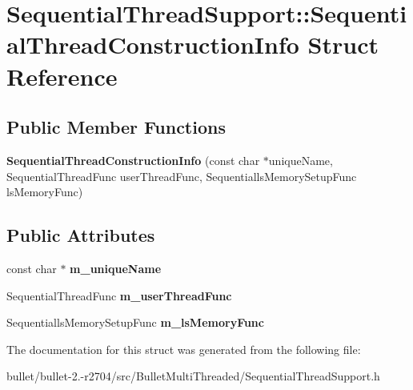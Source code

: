 \hypertarget{struct_sequential_thread_support_1_1_sequential_thread_construction_info}{\section{Sequential\+Thread\+Support\+:\+:Sequential\+Thread\+Construction\+Info Struct Reference}
\label{struct_sequential_thread_support_1_1_sequential_thread_construction_info}
}
\subsection*{Public Member Functions}
\begin{DoxyCompactItemize}
\item 
\hypertarget{struct_sequential_thread_support_1_1_sequential_thread_construction_info_a72715bc63af605f9b87b16559262d3fc}{{\bfseries Sequential\+Thread\+Construction\+Info} (const char $\ast$unique\+Name, Sequential\+Thread\+Func user\+Thread\+Func, Sequentialls\+Memory\+Setup\+Func ls\+Memory\+Func)}\label{struct_sequential_thread_support_1_1_sequential_thread_construction_info_a72715bc63af605f9b87b16559262d3fc}

\end{DoxyCompactItemize}
\subsection*{Public Attributes}
\begin{DoxyCompactItemize}
\item 
\hypertarget{struct_sequential_thread_support_1_1_sequential_thread_construction_info_a852632b3f6de1d08f380e9e4feb25492}{const char $\ast$ {\bfseries m\+\_\+unique\+Name}}\label{struct_sequential_thread_support_1_1_sequential_thread_construction_info_a852632b3f6de1d08f380e9e4feb25492}

\item 
\hypertarget{struct_sequential_thread_support_1_1_sequential_thread_construction_info_a11137c6bbe94036ed8711277092fcb18}{Sequential\+Thread\+Func {\bfseries m\+\_\+user\+Thread\+Func}}\label{struct_sequential_thread_support_1_1_sequential_thread_construction_info_a11137c6bbe94036ed8711277092fcb18}

\item 
\hypertarget{struct_sequential_thread_support_1_1_sequential_thread_construction_info_aa6f4b48dfebf248c31fb0fb14873c0d6}{Sequentialls\+Memory\+Setup\+Func {\bfseries m\+\_\+ls\+Memory\+Func}}\label{struct_sequential_thread_support_1_1_sequential_thread_construction_info_aa6f4b48dfebf248c31fb0fb14873c0d6}

\end{DoxyCompactItemize}


The documentation for this struct was generated from the following file\+:\begin{DoxyCompactItemize}
\item 
bullet/bullet-\/2.-\/r2704/src/\+Bullet\+Multi\+Threaded/Sequential\+Thread\+Support.\+h\end{DoxyCompactItemize}
